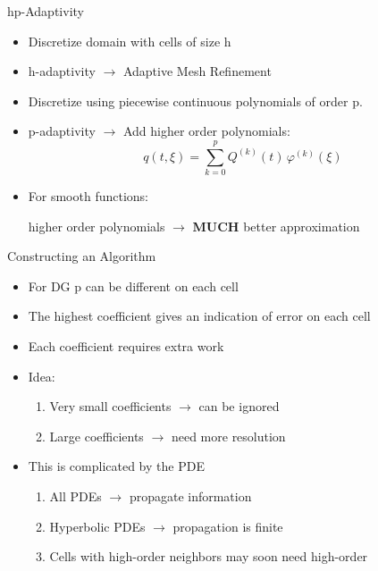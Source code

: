 \documentclass[sansserif]{beamer}
\begin{document}
\begin{frame}{hp-Adaptivity}
 \begin{itemize}
  \item Discretize domain with cells of size h
  \item h-adaptivity $\rightarrow$ Adaptive Mesh Refinement
  \item Discretize using piecewise continuous polynomials of order p.
  \item p-adaptivity $\rightarrow$ Add higher order polynomials:
  \[ q(t,\xi) = \sum_{k=0}^p Q^{(k)}(t) \, \varphi^{(k)}(\xi) \]
  \item {\color{red} For smooth functions:
  
  higher order polynomials $\rightarrow$ {\bf MUCH} better approximation}
 \end{itemize}
\end{frame}

\begin{frame}{Constructing an Algorithm}
\begin{itemize}
   \item For DG p can be different on each cell
  \item The highest coefficient gives an indication of error on each cell
    \item Each coefficient requires extra work
    \item {\color{red} Idea:}
    \begin{enumerate}
  \item Very small coefficients $\rightarrow$ can be ignored
  \item Large coefficients $\rightarrow$ need more resolution
  \end{enumerate}
  \item This is complicated by the PDE
  \begin{enumerate}
   \item All PDEs $\rightarrow$ propagate information
   \item Hyperbolic PDEs $\rightarrow$ propagation is finite
   \item Cells with high-order neighbors may soon need high-order
  \end{enumerate}
\end{itemize}
\end{frame}
\end{document}
